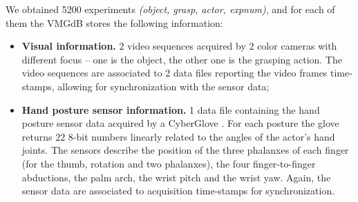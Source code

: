 We obtained 5200 experiments {\em (object, grasp, actor, expnum)}, and for each of them the VMGdB stores the following information:
\begin{itemize}
\item {\bf Visual information.} 2 video sequences  acquired by 2 color cameras with different focus -- one is the object, the other one is the grasping action. The video sequences
are associated to 2 data files reporting the video frames time-stamps, allowing for synchronization with the sensor data;
\item {\bf Hand posture sensor information.} 1 data file containing the hand posture sensor data acquired by a CyberGlove
\cite{cyberglove}. 
For each posture the glove returns $22$ $8$-bit numbers linearly related to the angles of the actor's hand joints. 
The sensors describe the position of the three phalanxes of each finger (for the thumb, rotation and two phalanxes), the four finger-to-finger
abductions, the palm arch, the wrist pitch and the wrist yaw. Again, the sensor data are associated to acquisition time-stamps for synchronization. 
\end{itemize}

